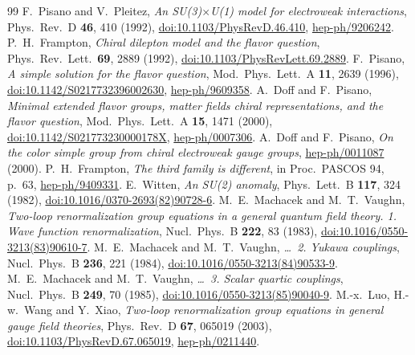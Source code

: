 \documentclass[11pt,a4paper]{article}
\begin{document}
\begin{thebibliography}{99}
 F.~Pisano and V.~Pleitez, \emph{An SU(3)$\times$U(1) model for electroweak interactions}, Phys.\ Rev.\ D \textbf{46}, 410 (1992), \href{https://doi.org/10.1103/PhysRevD.46.410}{doi:10.1103/PhysRevD.46.410}, \href{https://arxiv.org/abs/hep-ph/9206242}{hep-ph/9206242}.
 P.~H.~Frampton, \emph{Chiral dilepton model and the flavor question}, Phys.\ Rev.\ Lett.\ \textbf{69}, 2889 (1992), \href{https://doi.org/10.1103/PhysRevLett.69.2889}{doi:10.1103/PhysRevLett.69.2889}.
 F.~Pisano, \emph{A simple solution for the flavor question}, Mod.\ Phys.\ Lett.\ A \textbf{11}, 2639 (1996), \href{https://doi.org/10.1142/S0217732396002630}{doi:10.1142/S0217732396002630}, \href{https://arxiv.org/abs/hep-ph/9609358}{hep-ph/9609358}.
 A.~Doff and F.~Pisano, \emph{Minimal extended flavor groups, matter fields chiral representations, and the flavor question}, Mod.\ Phys.\ Lett.\ A \textbf{15}, 1471 (2000), \href{https://doi.org/10.1142/S021773230000178X}{doi:10.1142/S021773230000178X}, \href{https://arxiv.org/abs/hep-ph/0007306}{hep-ph/0007306}.
 A.~Doff and F.~Pisano, \emph{On the color simple group from chiral electroweak gauge groups}, \href{https://arxiv.org/abs/hep-ph/0011087}{hep-ph/0011087} (2000).
 P.~H.~Frampton, \emph{The third family is different}, in Proc.\ PASCOS 94, p.~63, \href{https://arxiv.org/abs/hep-ph/9409331}{hep-ph/9409331}.
 E.~Witten, \emph{An SU(2) anomaly}, Phys.\ Lett.\ B \textbf{117}, 324 (1982), \href{https://doi.org/10.1016/0370-2693(82)90728-6}{doi:10.1016/0370-2693(82)90728-6}.
 M.~E.~Machacek and M.~T.~Vaughn, \emph{Two-loop renormalization group equations in a general quantum field theory. 1. Wave function renormalization}, Nucl.\ Phys.\ B \textbf{222}, 83 (1983), \href{https://doi.org/10.1016/0550-3213(83)90610-7}{doi:10.1016/0550-3213(83)90610-7}.
 M.~E.~Machacek and M.~T.~Vaughn, \emph{\dots\ 2. Yukawa couplings}, Nucl.\ Phys.\ B \textbf{236}, 221 (1984), \href{https://doi.org/10.1016/0550-3213(84)90533-9}{doi:10.1016/0550-3213(84)90533-9}.
 M.~E.~Machacek and M.~T.~Vaughn, \emph{\dots\ 3. Scalar quartic couplings}, Nucl.\ Phys.\ B \textbf{249}, 70 (1985), \href{https://doi.org/10.1016/0550-3213(85)90040-9}{doi:10.1016/0550-3213(85)90040-9}.
 M.-x.~Luo, H.-w.~Wang and Y.~Xiao, \emph{Two-loop renormalization group equations in general gauge field theories}, Phys.\ Rev.\ D \textbf{67}, 065019 (2003), \href{https://doi.org/10.1103/PhysRevD.67.065019}{doi:10.1103/PhysRevD.67.065019}, \href{https://arxiv.org/abs/hep-ph/0211440}{hep-ph/0211440}.

\end{thebibliography}
\end{document}
